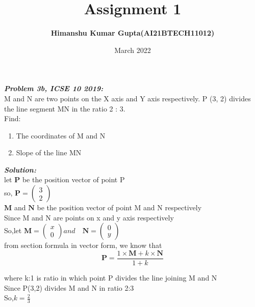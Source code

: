 \documentclass[journal,12pt,twocolumn]{IEEEtran}
\begin{document}
\newcommand{\myvec}[1]{\ensuremath{\begin{pmatrix}#1\end{pmatrix}}}

\let\vec\mathbf


\title{Assignment 1}
\author{\textbf{Himanshu Kumar Gupta(AI21BTECH11012)}}
\maketitle
\date {March 2022}


\textbf{\textit{Problem 3b, ICSE 10 2019:}}\\

 M and N are two points on the X axis and Y axis respectively. 
P (3, 2) divides the line segment MN in the ratio 2 : 3.\\
Find:
\begin{enumerate}
    \item The coordinates of M and N
    \item Slope of the line MN
\end{enumerate}

\textbf{\textit{Solution:}}\\

 let $\vec{P}$ be the position vector of point P\\
  so, $\vec{P}=\myvec{3 \\ 2}$\\
 $\vec{M}$ and $\vec{N}$ be the position vector of point M and N respectively\\
Since M and N are points on x and y axis respectively\\
  So,let $\vec{M}=\myvec{x\\0} and\quad \vec{N}=\myvec{0\\y}$\\
  
  from section formula in vector form, we know that\\
  \begin{equation}
  \label{eq:1}
\vec{P}=\frac{1\times \vec{M} +k\times \vec{N}}{1+k}     
  \end{equation}
 
  where k:1 is ratio in which point P divides the line joining M and N\\
Since P(3,2) divides M and N in ratio 2:3\\
So,$ k=\frac{2}{3}$\\
\end{document}
